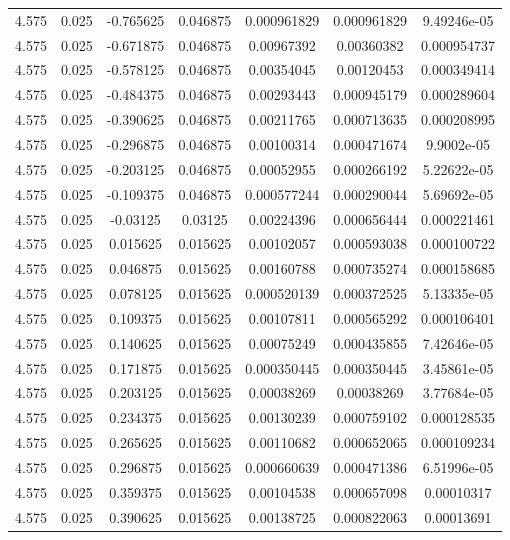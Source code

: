 \begin{table}[bh]
\begin{center}
{\begin{tabular}{ccccccc}
4.575	 & 0.025 & 	-0.765625	 & 0.046875	 & 0.000961829	 & 0.000961829	 & 9.49246e-05 \\ 
4.575	 & 0.025 & 	-0.671875	 & 0.046875	 & 0.00967392	 & 0.00360382	 & 0.000954737 \\ 
4.575	 & 0.025 & 	-0.578125	 & 0.046875	 & 0.00354045	 & 0.00120453	 & 0.000349414 \\ 
4.575	 & 0.025 & 	-0.484375	 & 0.046875	 & 0.00293443	 & 0.000945179	 & 0.000289604 \\ 
4.575	 & 0.025 & 	-0.390625	 & 0.046875	 & 0.00211765	 & 0.000713635	 & 0.000208995 \\ 
4.575	 & 0.025 & 	-0.296875	 & 0.046875	 & 0.00100314	 & 0.000471674	 & 9.9002e-05 \\ 
4.575	 & 0.025 & 	-0.203125	 & 0.046875	 & 0.00052955	 & 0.000266192	 & 5.22622e-05 \\ 
4.575	 & 0.025 & 	-0.109375	 & 0.046875	 & 0.000577244	 & 0.000290044	 & 5.69692e-05 \\ 
4.575	 & 0.025 & 	-0.03125	 & 0.03125	 & 0.00224396	 & 0.000656444	 & 0.000221461 \\ 
4.575	 & 0.025 & 	0.015625	 & 0.015625	 & 0.00102057	 & 0.000593038	 & 0.000100722 \\ 
4.575	 & 0.025 & 	0.046875	 & 0.015625	 & 0.00160788	 & 0.000735274	 & 0.000158685 \\ 
4.575	 & 0.025 & 	0.078125	 & 0.015625	 & 0.000520139	 & 0.000372525	 & 5.13335e-05 \\ 
4.575	 & 0.025 & 	0.109375	 & 0.015625	 & 0.00107811	 & 0.000565292	 & 0.000106401 \\ 
4.575	 & 0.025 & 	0.140625	 & 0.015625	 & 0.00075249	 & 0.000435855	 & 7.42646e-05 \\ 
4.575	 & 0.025 & 	0.171875	 & 0.015625	 & 0.000350445	 & 0.000350445	 & 3.45861e-05 \\ 
4.575	 & 0.025 & 	0.203125	 & 0.015625	 & 0.00038269	 & 0.00038269	 & 3.77684e-05 \\ 
4.575	 & 0.025 & 	0.234375	 & 0.015625	 & 0.00130239	 & 0.000759102	 & 0.000128535 \\ 
4.575	 & 0.025 & 	0.265625	 & 0.015625	 & 0.00110682	 & 0.000652065	 & 0.000109234 \\ 
4.575	 & 0.025 & 	0.296875	 & 0.015625	 & 0.000660639	 & 0.000471386	 & 6.51996e-05 \\ 
4.575	 & 0.025 & 	0.359375	 & 0.015625	 & 0.00104538	 & 0.000657098	 & 0.00010317 \\ 
4.575	 & 0.025 & 	0.390625	 & 0.015625	 & 0.00138725	 & 0.000822063	 & 0.00013691 \\ 

\end{tabular}}
\end{center}
\end{table}
